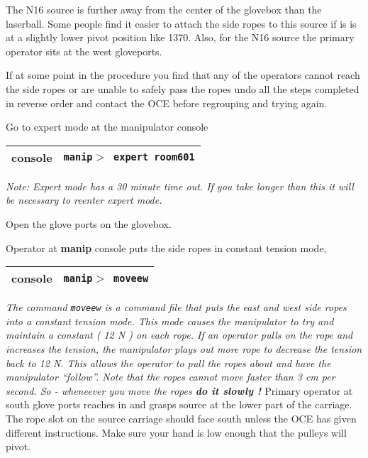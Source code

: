   The N16 source is further away from the center of the glovebox
than the laserball. Some people find it easier to attach the side ropes
to this source if is is at a slightly lower pivot position like
1370. Also, for the N16 source the primary operator sits at the west
gloveports.

  If at some point in the procedure you find that any of
the operators cannot reach the side ropes or are unable to safely
pass the ropes undo all the steps completed in reverse order and contact
the OCE before regrouping and trying again.

\begin{enumerate}


\checkitem Go to expert mode at the manipulator console

  \begin{center}
  \begin{tabular}{|l|l|}
  \hline
  console & {\tt manip$>$ expert room601} \\
  \hline
  \end{tabular}
  \end{center}
  {\small\em Note: Expert mode has a 30 minute time out.  If 
   you take longer than this it will be necessary to reenter expert mode.}

\checkitem Open the glove ports on the glovebox.


\checkitem Operator at {\bf manip} console puts the
  side ropes in constant tension mode,
  \begin{center}
  \begin{tabular}{|l|l|}
  \hline
  console & {\tt manip$>$ moveew} \\
  \hline
  \end{tabular}
  \end{center}
  \small
  {\em
    The command {\tt moveew} is a command file that puts the east and
    west side ropes into a constant tension mode.  This mode
    causes the manipulator to try and maintain a constant ( 12 N )
    on each rope.  If an operator pulls on the rope and increases the
    tension, the manipulator plays out more rope to decrease the tension
    back to 12 N.  This allows the operator to pull the ropes about
    and have the manipulator ``follow''. Note that the ropes cannot move
    faster than 3 cm per second. So - wheneever you move the ropes { \bf do
    it slowly ! } 
  }
  \normalsize
\checkitem Primary operator at south  glove ports reaches in and grasps source
  at the lower part of the carriage.  The rope slot   on the source carriage should face south unless
  the OCE has given different instructions. Make sure your hand is low enough that the pulleys will pivot.


\end{enumerate}
